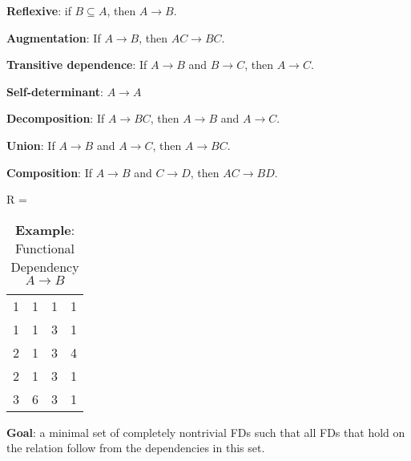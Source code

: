 \documentclass{article}
\begin{document}
\begin{outline}[enumerate]
        
\1 \textbf{Reflexive}: if $B \subseteq A$, then $A \to B$. 

\1 \textbf{Augmentation}:  If $A \to B$, then $AC \to BC$. 
 
\1 \textbf{Transitive dependence}: If $A \to B$ and $B \to C$, then $A\to
C$.



\1 \textbf{Self-determinant}:  $A \to A$

\1 \textbf{Decomposition}: If $A \to BC$, then $A \to B$ and $A \to C$.  

\1 \textbf{Union}: If $A \to B$ and $A \to C$, then $A \to BC$.

\1 \textbf{Composition}: If $A \to B$ and $C \to D$, then $AC \to BD$.  
\end{outline}
  
  
   
 
 
\begin{table}[h!]
\caption{\textbf{Example}: Functional Dependency $A \to B$}
\begin{center}

R = \begin{tabular}{|c|c|c|c|}
   \hline
  \cellcolor{excel}{A}  & \cellcolor{excel}{B}  &   \cellcolor{excel}{C}
&  \cellcolor{excel}{D}  \\
  \hline
  1 & 1 & 1  &   1 \\
      \hline
  1 & 1 & 3  &   1 \\
      \hline
  2 & 1 & 3  &   4 \\
      \hline
  2 & 1 & 3  &   1 \\
      \hline 
  3 & 6 & 3  &   1 \\
      \hline 
\end{tabular}
\end{center}
\label{tab:1}
\end{table}%
% 
% 
  

\noindent \textbf{Goal}: a minimal set of completely nontrivial FDs such that all FDs that hold on the relation follow from the dependencies in this set.  
 
  
  
\end{document}
